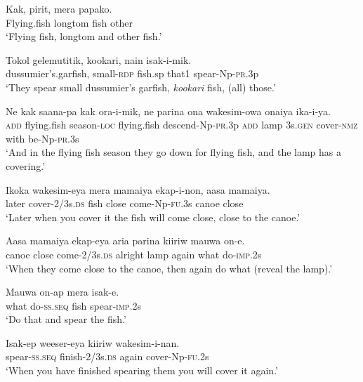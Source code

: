 {\ea\label{ex:a:x41}
\gll  Kak,  pirit,  mera  papako. \\
Flying.fish  longtom  fish  other \\
\glt ‘Flying fish, longtom and other fish.’ \\
\z


\ea\label{ex:a:x42}
\gll  Tokol  gelemutitik,  kookari,  nain  isak-i-mik. \\
dussumier’s.garfish,  small-\textsc{rdp}  fish.sp  that1  spear-Np-\textsc{pr}.3p \\
\glt ‘They spear small dussumier’s garfish, \textit{kookari} fish, (all) those.’ \\
\z


\ea\label{ex:a:x43}
\gll  Ne  kak  saana-pa  kak  ora-i-mik,  ne                      parina  ona  wakesim-owa  onaiya  ika-i-ya. \\
\textsc{add}  flying.fish  season-\textsc{loc}  flying.fish  descend-Np-\textsc{pr}.3p  \textsc{add}  lamp  3s.\textsc{gen}  cover-\textsc{nmz}  with  be-Np-\textsc{pr}.3s \\


\glt ‘And in the flying fish season they go down for flying fish, and the lamp has a covering.’ \\
\z


\ea\label{ex:a:x44}
\gll  Ikoka  wakesim-eya  mera  mamaiya  ekap-i-non,  aasa  mamaiya. \\
later  cover-2/3s.\textsc{ds}  fish  close  come-Np-\textsc{fu}.3s      canoe  close \\


\glt ‘Later when you cover it the fish will come close, close to the canoe.’ \\
\z


\ea\label{ex:a:x45}
\gll  Aasa  mamaiya  ekap-eya  aria  parina  kiiriw    mauwa  on-e. \\
canoe  close  come-2/3s.\textsc{ds}  alright  lamp  again       what  do-\textsc{imp}.2s \\


\glt ‘When they come close to the canoe, then again do what (reveal the lamp).’ \\
\z


\ea\label{ex:a:x46}
\gll  Mauwa  on-ap  mera  isak-e. \\
what  do-\textsc{ss.seq}  fish  spear-\textsc{imp}.2s \\
\glt ‘Do that and spear the fish.’ \\
\z


\ea\label{ex:a:x47}
\gll  Isak-ep  weeser-eya  kiiriw  wakesim-i-nan. \\
spear-\textsc{ss.seq}  finish-2/3s.\textsc{ds}  again  cover-Np-\textsc{fu}.2s \\
\glt ‘When you have finished spearing them you will cover it again.’ \\
\z


}
